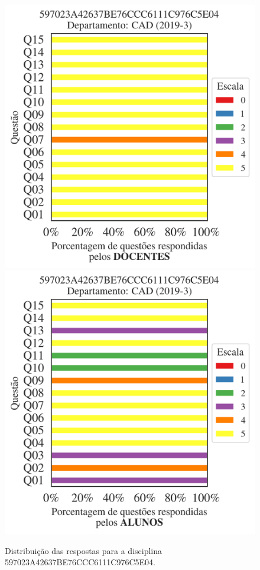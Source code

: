 \documentclass[a4paper,10pt]{article}
\begin{document}
\begin{figure}[h]
\centering
\includegraphics[width=0.485\linewidth]{analise_disciplina_departamento_CAD_597023A42637BE76CCC6111C976C5E04_docentes.png}
\includegraphics[width=0.485\linewidth]{analise_disciplina_departamento_CAD_597023A42637BE76CCC6111C976C5E04_alunos.png}
\caption{\label{fig:analise_geral_departamento}                Distribuição das respostas para a disciplina 597023A42637BE76CCC6111C976C5E04. }
\end{figure}
\end{document}

